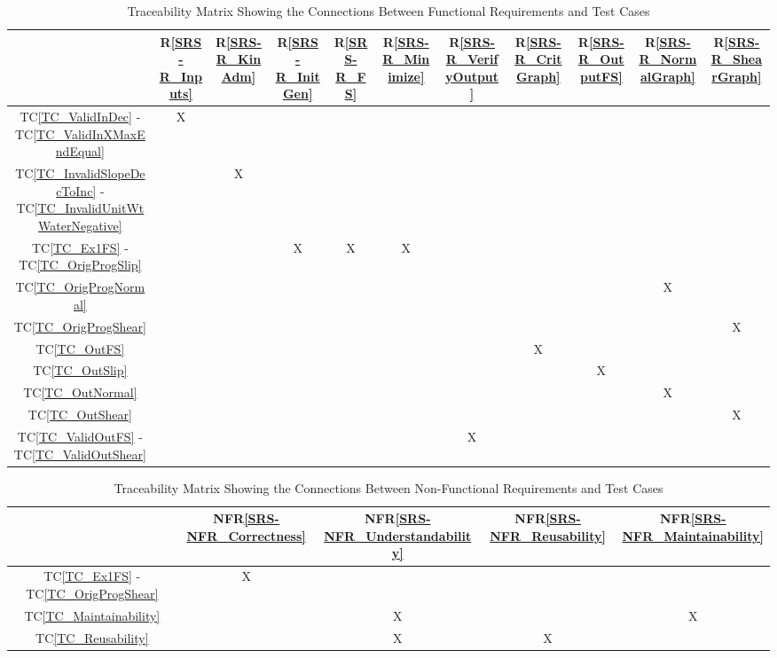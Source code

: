 \documentclass[12pt, titlepage]{article}
\newcommand{\rref}[1]{R\ref{#1}}
\newcommand{\nfrref}[1]{NFR\ref{#1}}
\newcommand{\tcref}[1]{TC\ref{#1}}
\begin{document}
\begin{table}[!h]
	\centering
	\begin{tabular}{|c|c|c|c|c|c|c|c|c|c|c|}
		\hline
		& \rref{SRS-R_Inputs}& \rref{SRS-R_KinAdm}& \rref{SRS-R_InitGen}& 
		\rref{SRS-R_FS}& \rref{SRS-R_Minimize} & \rref{SRS-R_VerifyOutput}& 
		\rref{SRS-R_CritGraph}& \rref{SRS-R_OutputFS}& 
		\rref{SRS-R_NormalGraph}& \rref{SRS-R_ShearGraph} \\
		\hline
		\tcref{TC_ValidInDec} - \tcref{TC_ValidInXMaxEndEqual}                 
		& X& & & & & & & & & \\ \hline
		\tcref{TC_InvalidSlopeDecToInc} - \tcref{TC_InvalidUnitWtWaterNegative} 
		& & X& & & & & & & & \\ \hline
		\tcref{TC_Ex1FS} - \tcref{TC_OrigProgSlip}                             
		& & & X& X& X& & & & & \\ \hline
		\tcref{TC_OrigProgNormal}                                              
		& & & & & & & & & X& \\ \hline
		\tcref{TC_OrigProgShear}                                               
		& & & & & & & & & & X\\ \hline
		\tcref{TC_OutFS}                                                       
		& & & & & & & X& & & \\ \hline
		\tcref{TC_OutSlip}                                                     
		& & & & & & & & X& & \\ \hline
		\tcref{TC_OutNormal}                                                   
		& & & & & & & & & X& \\ \hline
		\tcref{TC_OutShear}                                                    
		& & & & & & & & & & X \\ \hline
		\tcref{TC_ValidOutFS} - \tcref{TC_ValidOutShear}                        
		& & & & & & X& & & & \\
		\hline
	\end{tabular}
	\caption{Traceability Matrix Showing the Connections Between Functional 
	Requirements and Test Cases}
	\label{Table:T_trace}
\end{table}

\begin{table}[!h]
	\centering
	\begin{tabular}{|c|c|c|c|c|}
		\hline
		& \nfrref{SRS-NFR_Correctness}& \nfrref{SRS-NFR_Understandability}& 
		\nfrref{SRS-NFR_Reusability}& \nfrref{SRS-NFR_Maintainability} \\
		\hline
		\tcref{TC_Ex1FS} - \tcref{TC_OrigProgShear}                             
		& X& & & \\ \hline
		\tcref{TC_Maintainability}                                            
		& & X& &X \\ \hline
		\tcref{TC_Reusability}                     
		& & X& X& \\
		\hline
	\end{tabular}
	\caption{Traceability Matrix Showing the Connections Between Non-Functional 
	Requirements and Test Cases}
	\label{Table:NFR_trace}
\end{table}
\end{document}
